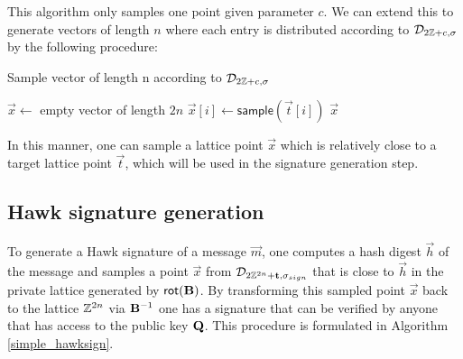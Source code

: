 This algorithm only samples one point given parameter $c$.
We can extend this to generate vectors of length $n$ where each entry is distributed according to $\mathcal{D}_{2\mathbb{Z}+c, \sigma}$ by the following procedure:
\begin{algorithm}[H]
\caption{Sample vector of length n according to $\mathcal{D}_{2\mathbb{Z}+c, \sigma}$}
\begin{algorithmic}[1]
    \State $\vec{x} \gets$ empty vector of length $2n$
    \State $\vec{x}[i] \gets \mathsf{sample}(\vec{t}[i])$
    \EndFor
    \Return $\vec{x}$
\end{algorithmic}
\end{algorithm}

In this manner, one can sample a lattice point $\vec{x}$ which is relatively close to a target lattice point $\vec{t}$, which will be used in the signature generation step.

\subsection{Hawk signature generation}
To generate a Hawk signature of a message $\vec{m}$, one computes a hash digest $\vec{h}$ of the message 
and samples a point $\vec{x}$ from $\mathcal{D}_{2\mathbb{Z}^{2n} + \mathbf{t}, \sigma_{sign}}$ that is close to $\vec{h}$ in the 
private lattice generated by $\mathsf{rot}(\mathbf{B})$. By transforming this sampled point $\vec{x}$ back to the lattice $\mathbb{Z}^{2n}$ via $\mathbf{B}^{-1}$ one has a signature that can be verified 
by anyone that has access to the public key $\mathbf{Q}$.
This procedure is formulated in Algorithm \ref{simple_hawksign}.



